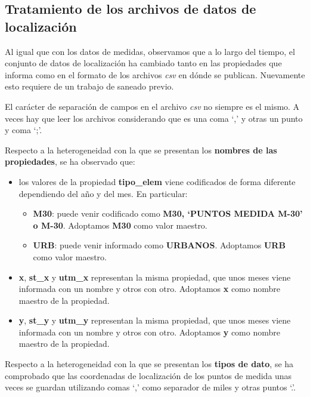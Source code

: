 \documentclass[]{book}
\providecommand{\tightlist}{%
  \setlength{\itemsep}{0pt}\setlength{\parskip}{0pt}}
\begin{document}
\subsection{Tratamiento de los archivos de datos de
localización}\label{tratamiento-de-los-archivos-de-datos-de-localizacion}

Al igual que con los datos de medidas, observamos que a lo largo del
tiempo, el conjunto de datos de localización ha cambiado tanto en las
propiedades que informa como en el formato de los archivos \emph{csv} en
dónde se publican. Nuevamente esto requiere de un trabajo de saneado
previo.

El carácter de separación de campos en el archivo \emph{csv} no siempre
es el mismo. A veces hay que leer los archivos considerando que es una
coma `,' y otras un punto y coma `;'.

Respecto a la heterogeneidad con la que se presentan los \textbf{nombres
de las propiedades}, se ha observado que:

\begin{itemize}
\tightlist
\item
  los valores de la propiedad \textbf{tipo\_elem} viene codificados de
  forma diferente dependiendo del año y del mes. En particular:

  \begin{itemize}
  \tightlist
  \item
    \textbf{M30}: puede venir codificado como \textbf{M30, `PUNTOS
    MEDIDA M-30' o M-30}. Adoptamos \textbf{M30} como valor maestro.
  \item
    \textbf{URB}: puede venir informado como \textbf{URBANOS}. Adoptamos
    \textbf{URB} como valor maestro.
  \end{itemize}
\item
  \textbf{x}, \textbf{st\_x} y \textbf{utm\_x} representan la misma
  propiedad, que unos meses viene informada con un nombre y otros con
  otro. Adoptamos \textbf{x} como nombre maestro de la propiedad.
\item
  \textbf{y}, \textbf{st\_y} y \textbf{utm\_y} representan la misma
  propiedad, que unos meses viene informada con un nombre y otros con
  otro. Adoptamos \textbf{y} como nombre maestro de la propiedad.
\end{itemize}

Respecto a la heterogeneidad con la que se presentan los \textbf{tipos
de dato}, se ha comprobado que las coordenadas de localización de los
puntos de medida unas veces se guardan utilizando comas `,' como
separador de miles y otras puntos `.'.
\end{document}
